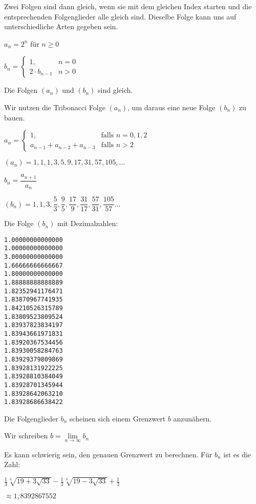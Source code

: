 \begin{frame}[fragile]
Zwei Folgen sind dann gleich, wenn sie mit dem gleichen Index starten und die entsprechenden Folgenglieder alle gleich sind. Dieselbe Folge kann uns auf unterschiedliche Arten gegeben sein.  \pause

$a_n = 2^n$ für $n \ge 0$ \pause

$b_n=\begin{cases}
 1,  & n=0 \\
 2 \cdot b_{n-1} & n > 0 
\end{cases} $  \pause

Die Folgen $(a_n)$ und $(b_n)$ sind gleich.
\end{frame}

\begin{frame}[fragile]
Wir nutzen die Tribonacci Folge $(a_n)$, um daraus eine neue Folge $(b_n)$ zu bauen.  \pause

$a_n=\begin{cases}
 1,  & \text{falls } n=0,1,2 \\
 a_{n-1}+a_{n-2}+a_{n-3} & \text{falls } n > 2
\end{cases} $  \pause

$(a_n) = 1, 1,1,3,5,9,17,31,57,105,...$ \pause

$b_n = \dfrac{a_{n+1}}{a_n}$ \pause

$(b_n) = 1, 1,3,\dfrac{5}{3}, \dfrac{9}{5}, \dfrac{17}{9}, \dfrac{31}{17}, \dfrac{57}{31}, \dfrac{105}{57} ...$ \pause

Die Folge $(b_n)$ mit Dezimalzahlen:
\end{frame}

\begin{frame}[fragile]
\begin{minipage}[t]{4cm}
\begin{lstlisting} 
1.00000000000000
1.00000000000000
3.00000000000000
1.66666666666667
1.80000000000000
1.88888888888889
1.82352941176471
1.83870967741935
1.84210526315789
1.83809523809524
1.83937823834197
1.83943661971831
1.83920367534456
1.83930058284763
1.83929379809869
1.83928131922225
1.83928810384049
1.83928701345944
1.83928642063210
1.83928686638422
\end{lstlisting} 
\end{minipage} 
\begin{minipage}[t]{6cm} \pause
\bigskip
Die Folgenglieder $b_n$ scheinen sich einem Grenzwert $b$ anzunähern.  \\ \pause

Wir schreiben $b = \lim \limits_{n \to \infty} b_n$ \\ \pause

Es kann schwierig sein, den genauen Grenzwert zu berechnen. \pause Für $b_n$ ist es die Zahl: 
\bigskip

$\frac{1}{3}\sqrt[3]{19 + 3\sqrt{33}} - \frac{1}{3}\sqrt[3]{19 - 3\sqrt{33}} + \frac{1}{3}$ 
\bigskip

$\approx 1,8392867552$ 
\end{minipage} 
\end{frame}

